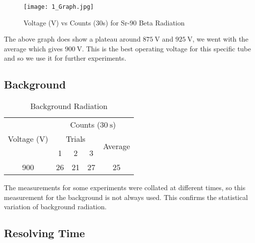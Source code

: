 \documentclass[11pt]{article}
\begin{document}
	\begin{figure}[htbp]
		\centering
		\texttt{[image: 1\_Graph.jpg]}
		\caption{Voltage ($\unit{\volt}$) vs Counts (30s) for Sr-90 Beta Radiation}
		\label{fig:1_Graph}
	\end{figure}
	
	The above graph does show a plateau around $\qty{875}{\volt}$ and $\qty{925}{\volt}$, we went with the average which gives $\qty{900}{\volt}$. This is the best operating voltage for this specific tube and so we use it for further experiments.
	
\clearpage

	\subsection{Background}
	
	\begin{table}[htbp]
		\centering
		\caption{Background Radiation}
		\begin{tabular}{ccccc}
			\toprule
			\multirow{3}[6]{*}{Voltage ($\unit{\volt}$)} & \multicolumn{4}{c}{Counts ($\qty{30}{\second}$)} \\
			\cmidrule{2-5}      & \multicolumn{3}{c}{Trials} & \multirow{2}[4]{*}{Average} \\
			\cmidrule{2-4}      & 1 & 2 & 3 &  \\
			\midrule
			900 & 26 & 21 & 27 & 25 \\
			\bottomrule
		\end{tabular}%
		\label{tab:3_Table}%
	\end{table}%
	
	The measurements for some experiments were collated at different times, so this measurement for the background is not always used. This confirms the statistical variation of background radiation.
	
\clearpage
	
	\subsection{Resolving Time}
	
\end{document}
